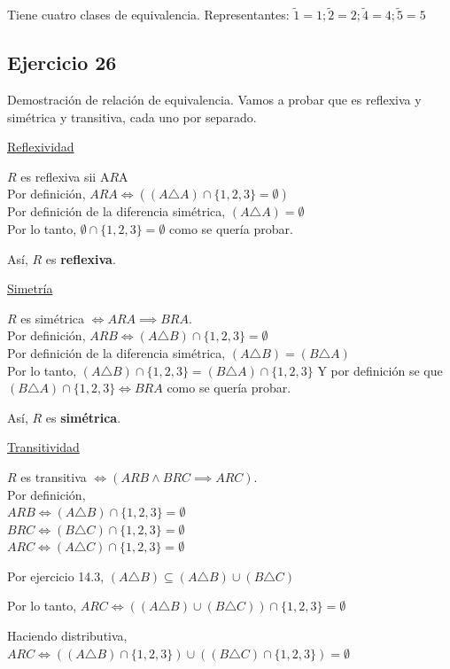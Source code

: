Tiene cuatro clases de equivalencia. Representantes: $\tilde{1} = 1; \tilde{2} = 2; \tilde{4} = 4; \tilde{5} = 5$

\subsection{Ejercicio 26}
Demostración de relación de equivalencia. Vamos a probar que es reflexiva y simétrica y transitiva, cada uno por separado.

\underline{Reflexividad}

$R$ es reflexiva sii A$R$A \\
Por definición, $ARA \iff ((A \triangle A) \cap \{ 1,2,3 \} = \emptyset) $\\
Por definición de la diferencia simétrica, $(A \triangle A) = \emptyset$ \\
Por lo tanto, $\emptyset \cap \{ 1,2,3 \} = \emptyset$ como se quería probar.

Así, $R$ es \textbf{reflexiva}.

\underline{Simetría}

$R$ es simétrica $\iff ARA \implies BRA$.\\
Por definición, $ARB \iff (A \triangle B) \cap \{ 1,2,3 \} = \emptyset$ \\
Por definición de la diferencia simétrica, $(A \triangle B) = (B \triangle A)$ \\
Por lo tanto, $(A \triangle B) \cap \{ 1,2,3 \} = (B \triangle A) \cap \{ 1,2,3 \}$
Y por definición se que $(B \triangle A) \cap \{ 1,2,3 \} \iff BRA$ como se quería probar.

Así, $R$ es \textbf{simétrica}.

\underline{Transitividad}

$R$ es transitiva $\iff (ARB \wedge BRC \implies ARC)$.\\
Por definición, \\$ARB \iff (A \triangle B) \cap \{ 1,2,3 \} = \emptyset$ \\
                  $BRC \iff (B \triangle C) \cap \{ 1,2,3 \} = \emptyset$ \\
                  $ARC \iff (A \triangle C) \cap \{ 1,2,3 \} = \emptyset$

Por ejercicio 14.3, $(A \triangle B) \subseteq (A \triangle B) \cup (B \triangle C)$

Por lo tanto, $ARC \iff ((A \triangle B) \cup (B \triangle C)) \cap \{ 1,2,3 \} = \emptyset$

Haciendo distributiva, $ARC \iff ((A \triangle B) \cap \{ 1,2,3 \}) \cup ((B \triangle C) \cap \{ 1,2,3 \}) = \emptyset$

